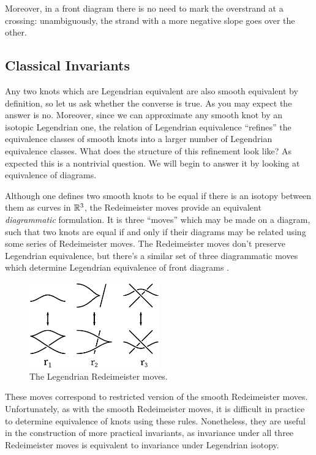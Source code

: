 Moreover, in a front diagram there is no need to mark the overstrand at a crossing: unambiguously, the strand with a more negative slope goes over the other.

\subsection{Classical Invariants}

Any two knots which are Legendrian equivalent are also smooth equivalent by definition, so let us ask whether the converse is true.
As you may expect the answer is no. Moreover, since we can approximate any smooth knot by an isotopic Legendrian one, the relation of Legendrian equivalence ``refines'' the equivalence classes of smooth knots into a larger number of Legendrian equivalence classes. What does the structure of this refinement look like? As expected this is a nontrivial question. We will begin to answer it by looking at equivalence of diagrams.

Although one defines two smooth knots to be equal if there is an isotopy between them as curves in $\mathbb{R}^3$, the Redeimeister moves provide an equivalent \emph{diagrammatic} formulation.
It is three ``moves'' which may be made on a diagram, such that two knots are equal if and only if their diagrams may be related using some series of Redeimeister moves.
The Redeimeister moves don't preserve Legendrian equivalence, but there's a similar set of three diagrammatic moves which determine Legendrian equivalence of front diagrams  \cite{swiatkowski}.

\begin{figure}[ht]
    \centering
    \includegraphics[width=0.5\textwidth]{images/redeimeister.pdf}
    \caption{The Legendrian Redeimeister moves.}%
    \label{fig:redemeister}
\end{figure}

These moves correspond to restricted version of the smooth Redeimeister moves.
Unfortunately, as with the smooth Redeimeister moves, it is difficult in practice to determine equivalence of knots using these rules. Nonetheless, they are useful in the construction of more practical invariants, as invariance under all three Redeimeister moves is equivalent to invariance under Legendrian isotopy.

